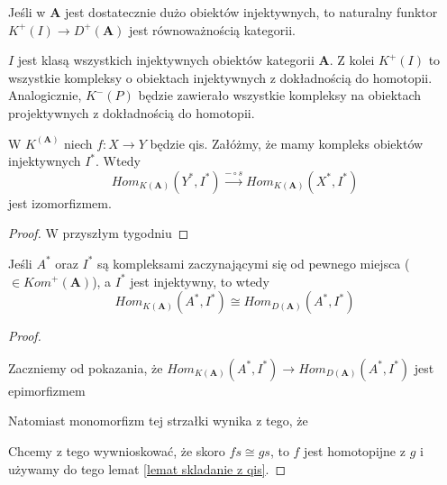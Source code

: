 \begin{theorem}
  Jeśli w $\mathbf{A}$ jest dostatecznie dużo obiektów injektywnych, to naturalny funktor 
  $K^+(I)\to D^+(\mathbf{A})$ jest równoważnością kategorii.
\end{theorem}

$I$ jest klasą wszystkich injektywnych obiektów kategorii $\mathbf{A}$. Z kolei $K^+(I)$ to wszystkie kompleksy o obiektach injektywnych z dokładnością do homotopii. Analogicznie, $K^-(P)$ będzie zawierało wszystkie kompleksy na obiektach projektywnych z dokładnością do homotopii.

\begin{lemma}\label{lemat skladanie z qis}
  W $K^(\mathbf{A})$ niech $f:X\to Y$ będzie qis. Załóżmy, że mamy kompleks obiektów injektywnych $I^*$. Wtedy
  $$Hom_{K(\mathbf{A})}(Y^*, I^*)\xrightarrow{-\circ s}Hom_{K(\mathbf{A})}(X^*, I^*)$$
  jest izomorfizmem. 
\end{lemma}

\begin{proof}
  W przyszłym tygodniu
\end{proof}

\begin{conclusion}
  Jeśli $A^*$ oraz $I^*$ są kompleksami zaczynającymi się od pewnego miejsca ($\in Kom^+(\mathbf{A})$), a $I^*$ jest injektywny, to wtedy
  $$Hom_{K(\mathbf{A})}(A^*, I^*)\cong Hom_{D(\mathbf{A})}(A^*, I^*)$$
\end{conclusion}

\begin{proof}
  \begin{center}\end{center}

  Zaczniemy od pokazania, że $Hom_{K(\mathbf{A})}(A^*, I^*)\to Hom_{D(\mathbf{A})}(A^*, I^*)$ jest epimorfizmem
  \begin{center}\end{center}
  
  Natomiast monomorfizm tej strzałki wynika z tego, że 
  \begin{center}\end{center}
  Chcemy z tego wywnioskować, że skoro $fs\cong gs$, to $f$ jest homotopijne z $g$ i używamy do tego lemat \ref{lemat skladanie z qis}.
\end{proof}
